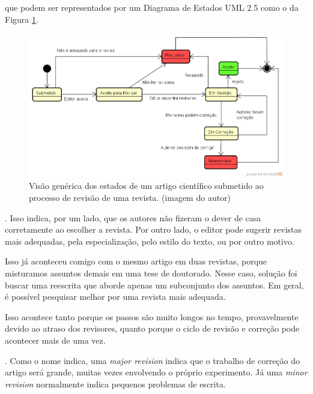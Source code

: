 \documentclass[openany]{book}
\begin{document}
 que podem ser representados por um Diagrama  de Estados UML 2.5 como o da Figura \ref{fig:maquina}.

\begin{figure}
    \centering
    \includegraphics[width=0.7\linewidth]{imagens/MaquinaEstadoArtigo.png}
    \caption[Visão genérica dos estados de um artigo científico]{Visão genérica dos estados de um artigo científico submetido ao processo de revisão de uma revista. (imagem do autor)}
    \label{fig:maquina}
\end{figure}

. Isso indica, por um lado, que os autores não fizeram o dever de casa corretamente ao escolher a revista. Por outro lado, o editor pode sugerir revistas mais adequadas, pela especialização, pelo estilo do texto, ou por outro motivo.


 Isso já aconteceu comigo com o mesmo artigo em duas revistas, porque misturamos assuntos demais em uma tese de doutorado. Nesse caso, solução foi buscar uma reescrita que aborde apenas um subconjunto dos assuntos. Em geral, é possível pesquisar melhor por uma revista mais adequada.

 Isso acontece tanto porque os passos são muito longos no tempo, provavelmente devido ao atraso dos revisores, quanto porque o ciclo de revisão e correção pode acontecer mais de uma vez.

. Como o nome indica, uma \textit{major revision} indica que o trabalho de correção do artigo será grande, muitas vezes envolvendo o próprio experimento. Já uma \textit{minor revision} normalmente indica pequenos problemas de escrita.
\end{document}
